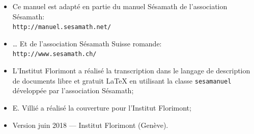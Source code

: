 \documentclass[TS]{sesamanuel}
\begin{document}
\newpage


\begin{prerequis}
\begin{itemize}
\item  Ce manuel est adapté en partie du manuel Sésamath de l'association Sésamath:\\
\texttt{http://manuel.sesamath.net/}
\item … Et de l'association Sésamath Suisse romande:\\ \texttt{http://www.sesamath.ch/}
\item L'Institut Florimont a réalisé la transcription dans le langage de description de documents libre et gratuit \LaTeX{} en utilisant la classe \texttt{sesamanuel} développée par l'association Sésamath;
\item E. Villié a réalisé la couverture pour l'Institut Florimont;
\item Version juin 2018 --- Institut Florimont (Genève).
\end{itemize}
 \end{prerequis}

\vspace{10em}





\setcounter{chapter}{0}

\themaC
\themaG


\setcounter{page}{6}

\themaC


\themaG


\themaC


\themaG


\themaC


\themaG


\themaC


\themaG


\AfficheListeMethodes
\AfficheCorriges[2]
\AfficheLexique
\end{document}
